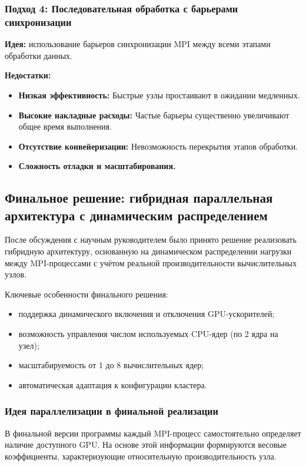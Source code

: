 \documentclass[areaset=advanced]{scrartcl}
\begin{document}
\subsubsection{Подход 4: Последовательная обработка с барьерами синхронизации}

\textbf{Идея:} использование барьеров синхронизации MPI между всеми этапами
обработки данных.

\textbf{Недостатки:}
\begin{itemize}
    \item \textbf{Низкая эффективность:} Быстрые узлы простаивают в ожидании медленных.
    \item \textbf{Высокие накладные расходы:} Частые барьеры существенно увеличивают
    общее время выполнения.
    \item \textbf{Отсутствие конвейеризации:} Невозможность перекрытия этапов
    обработки.
    \item \textbf{Сложность отладки и масштабирования.}
\end{itemize}
\subsection{Финальное решение: гибридная параллельная архитектура с динамическим распределением}
После обсуждения с научным руководителем было принято решение реализовать
гибридную архитектуру, основанную на динамическом распределении нагрузки между
MPI-процессами с учётом реальной производительности вычислительных узлов.

Ключевые особенности финального решения:
\begin{itemize}
    \item поддержка динамического включения и отключения GPU-ускорителей;
    \item возможность управления числом используемых CPU-ядер (по 2 ядра на узел);
    \item масштабируемость от 1 до 8 вычислительных ядер;
    \item автоматическая адаптация к конфигурации кластера.
\end{itemize}

\subsubsection{Идея параллелизации в финальной реализации}

В финальной версии программы каждый MPI-процесс самостоятельно определяет наличие
доступного GPU. На основе этой информации формируются весовые коэффициенты,
характеризующие относительную производительность узла.
\end{document}
